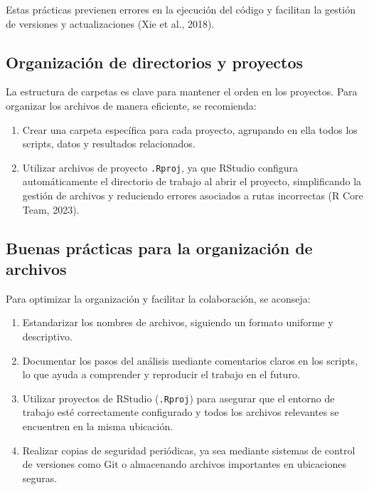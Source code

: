 \documentclass[
  spanish,
  a4paper,
  DIV=11,
  numbers=noendperiod,
  onepage,
  openany]{scrreprt}
\begin{document}
Estas prácticas previenen errores en la ejecución del código y facilitan
la gestión de versiones y actualizaciones (Xie et al., 2018).

\subsection{Organización de directorios y
proyectos}\label{organizaciuxf3n-de-directorios-y-proyectos}

La estructura de carpetas es clave para mantener el orden en los
proyectos. Para organizar los archivos de manera eficiente, se
recomienda:

\begin{enumerate}
\def\labelenumi{\arabic{enumi}.}
\item
  Crear una carpeta específica para cada proyecto, agrupando en ella
  todos los scripts, datos y resultados relacionados.
\item
  Utilizar archivos de proyecto \texttt{.Rproj}, ya que RStudio
  configura automáticamente el directorio de trabajo al abrir el
  proyecto, simplificando la gestión de archivos y reduciendo errores
  asociados a rutas incorrectas (R Core Team, 2023).
\end{enumerate}

\subsection{Buenas prácticas para la organización de
archivos}\label{buenas-pruxe1cticas-para-la-organizaciuxf3n-de-archivos}

Para optimizar la organización y facilitar la colaboración, se aconseja:

\begin{enumerate}
\def\labelenumi{\arabic{enumi}.}
\item
  Estandarizar los nombres de archivos, siguiendo un formato uniforme y
  descriptivo.
\item
  Documentar los pasos del análisis mediante comentarios claros en los
  scripts, lo que ayuda a comprender y reproducir el trabajo en el
  futuro.
\item
  Utilizar proyectos de RStudio (\texttt{.Rproj}) para asegurar que el
  entorno de trabajo esté correctamente configurado y todos los archivos
  relevantes se encuentren en la misma ubicación.
\item
  Realizar copias de seguridad periódicas, ya sea mediante sistemas de
  control de versiones como Git o almacenando archivos importantes en
  ubicaciones seguras.
\end{enumerate}
\end{document}
